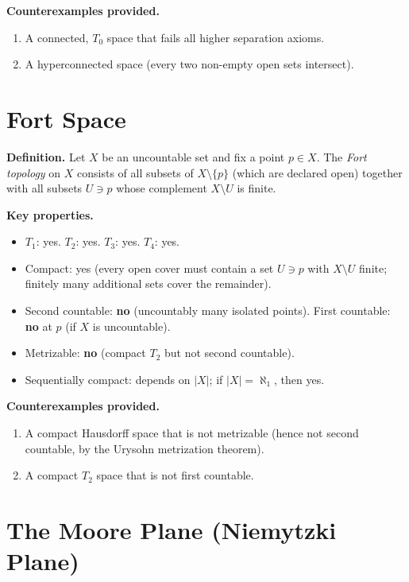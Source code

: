 \documentclass[11pt,a4paper,twoside]{book}
\theoremstyle{remark}
\theoremstyle{definition}
\theoremstyle{definition}
\begin{document}
\textbf{Counterexamples provided.}
\begin{enumerate}
  \item A connected, $T_0$ space that fails all higher separation axioms.
  \item A hyperconnected space (every two non-empty open sets intersect).
\end{enumerate}

\section{Fort Space}
\label{app:fort-space}

\textbf{Definition.}
Let $X$ be an uncountable set and fix a point $p\in X$.  The
\emph{Fort topology} on $X$ consists of all subsets of $X\setminus\{p\}$
(which are declared open) together with all subsets $U\ni p$ whose
complement $X\setminus U$ is finite.

\medskip
\textbf{Key properties.}
\begin{itemize}
  \item $T_1$: yes. \quad $T_2$: yes. \quad $T_3$: yes. \quad $T_4$: yes.
  \item Compact: yes (every open cover must contain a set $U\ni p$ with
        $X\setminus U$ finite; finitely many additional sets cover the
        remainder).
  \item Second countable: \textbf{no} (uncountably many isolated
        points). \quad First countable: \textbf{no} at $p$ (if $X$ is
        uncountable).
  \item Metrizable: \textbf{no} (compact $T_2$ but not second
        countable).
  \item Sequentially compact: depends on $|X|$; if $|X|=\aleph_1$,
        then yes.
\end{itemize}

\textbf{Counterexamples provided.}
\begin{enumerate}
  \item A compact Hausdorff space that is not metrizable (hence not
        second countable, by the Urysohn metrization theorem).
  \item A compact $T_2$ space that is not first countable.
\end{enumerate}

\section{The Moore Plane (Niemytzki Plane)}
\label{app:moore-plane}
\end{document}
